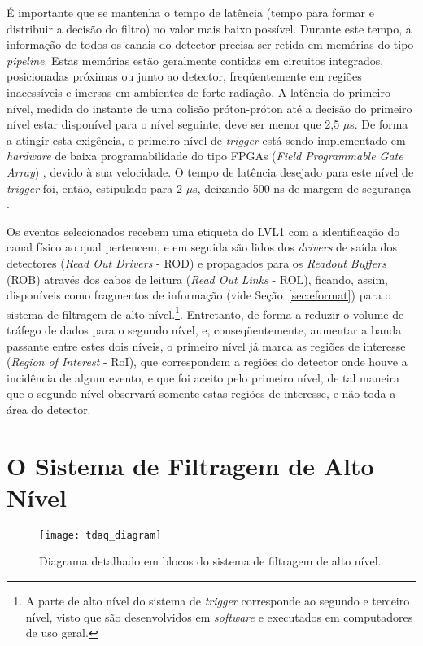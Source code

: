 É importante que se mantenha o tempo de latência (tempo para formar e distribuir a decisão do filtro) no valor mais baixo possível. Durante este tempo, a informação de todos os canais do detector precisa ser retida em memórias do tipo \emph{pipeline}. Estas memórias estão geralmente contidas em circuitos integrados, posicionadas próximas ou junto ao detector, freqüentemente em regiões inacessíveis e imersas em ambientes de forte radiação. A latência do primeiro nível, medida do instante de uma colisão próton-próton até a decisão do primeiro nível estar disponível para o nível seguinte, deve ser menor que 2,5 $\mu$s. De forma a atingir esta exigência, o primeiro nível de \emph{trigger} está sendo implementado em \emph{hardware} de baixa programabilidade do tipo FPGAs (\emph{Field Programmable Gate Array}) \cite{bib:fpga}, devido à sua velocidade. O tempo de latência desejado para este nível de \emph{trigger} foi, então, estipulado para 2 $\mu$s, deixando 500 ns de margem de segurança \cite{bib:lvl1_trigger_tdr}.

Os eventos selecionados recebem uma etiqueta do LVL1 com a identificação do canal físico ao qual pertencem, e em seguida são lidos dos \emph{drivers} de saída dos detectores (\emph{Read Out Drivers} - ROD) e propagados para os \emph{Readout Buffers} (ROB) através dos cabos de leitura (\emph{Read Out Links} - ROL), ficando, assim, disponíveis como fragmentos de informação (vide Seção~\ref{sec:eformat}) para o sistema de filtragem de alto nível.\footnote{A parte de alto nível do sistema de \emph{trigger} corresponde ao segundo e terceiro nível, visto que são desenvolvidos em \emph{software} e executados em computadores de uso geral.}. Entretanto, de forma a reduzir o volume de tráfego de dados para o segundo nível, e, conseqüentemente, aumentar a banda passante entre estes dois níveis, o primeiro nível já marca as regiões de interesse (\emph{Region of Interest} - RoI), que correspondem a regiões do detector onde houve a incidência de algum evento, e que foi aceito pelo primeiro nível, de tal maneira que o segundo nível observará somente estas regiões de interesse, e não toda a área do detector.




\section{O Sistema de Filtragem de Alto Nível}
\label{sec:htl}

\begin{figure}
\begin{center}
\texttt{[image: tdaq\_diagram]}
\caption{Diagrama detalhado em blocos do sistema de filtragem de alto nível.}
\label{fig:tdaq_diagram}
\end{center}
\end{figure}

